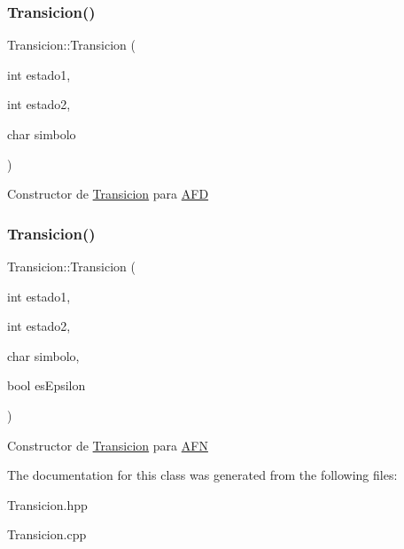 \subsubsection{\texorpdfstring{Transicion()}{Transicion()}\hspace{0.1cm}{\footnotesize\ttfamily [1/2]}}
{\footnotesize\ttfamily Transicion\+::\+Transicion (\begin{DoxyParamCaption}\item[{int}]{estado1,  }\item[{int}]{estado2,  }\item[{char}]{simbolo }\end{DoxyParamCaption})}

Constructor de \hyperlink{class_transicion}{Transicion} para \hyperlink{class_a_f_d}{A\+FD} \mbox{\label{class_transicion_a40753eedf9868e28af9e19397386d46e}} 
\subsubsection{\texorpdfstring{Transicion()}{Transicion()}\hspace{0.1cm}{\footnotesize\ttfamily [2/2]}}
{\footnotesize\ttfamily Transicion\+::\+Transicion (\begin{DoxyParamCaption}\item[{int}]{estado1,  }\item[{int}]{estado2,  }\item[{char}]{simbolo,  }\item[{bool}]{es\+Epsilon }\end{DoxyParamCaption})}

Constructor de \hyperlink{class_transicion}{Transicion} para \hyperlink{class_a_f_n}{A\+FN} 

The documentation for this class was generated from the following files\+:\begin{DoxyCompactItemize}
\item 
Transicion.\+hpp\item 
Transicion.\+cpp\end{DoxyCompactItemize}
